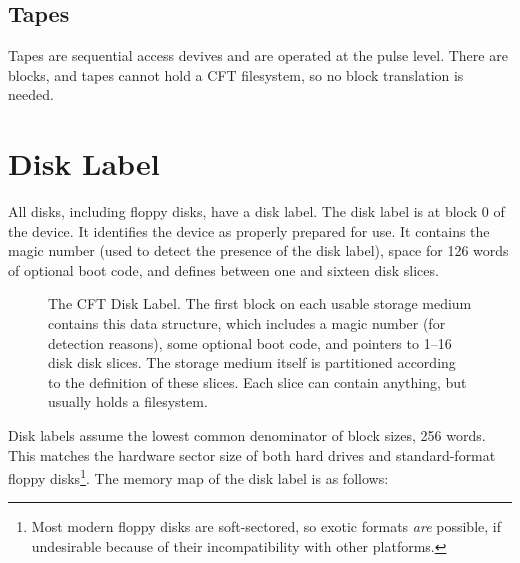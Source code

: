 \subsection{Tapes}

Tapes are sequential access devives and are operated at the pulse level. There
are blocks, and tapes cannot hold a CFT filesystem, so no block translation is
needed.

\section{Disk Label}
\label{sec:disk-label}
\label{sec:disklabel}
\label{sec:disk-slices}

All disks, including floppy disks, have a \gls{disk label}. The disk
label is at block 0 of the device. It identifies the device as
properly prepared for use. It contains the magic number
\magicDiskLabel (used to detect the presence of the disk label), space
for 126 words of optional boot code, and defines between one and
sixteen \glspl{disk slice}.

\begin{figure}
 \centering
 

 \caption[Disk Label]{\label{fig:storage-medium-organisation} The CFT
   Disk Label. The first block on each usable storage medium contains
   this data structure, which includes a magic number (for detection
   reasons), some optional boot code, and pointers to 1–16 disk
   \glspl{disk slice}. The storage medium itself is partitioned
   according to the definition of these slices. Each slice can contain
   anything, but usually holds a \gls{filesystem}.}
\end{figure}

Disk labels assume the lowest common denominator of block sizes, 256
words. This matches the hardware sector size of both hard drives and
standard-format floppy disks\footnote{Most modern floppy disks are
  soft-sectored, so exotic formats {\em are\/} possible, if undesirable
  because of their incompatibility with other platforms.}. The memory
map of the disk label is as follows:


